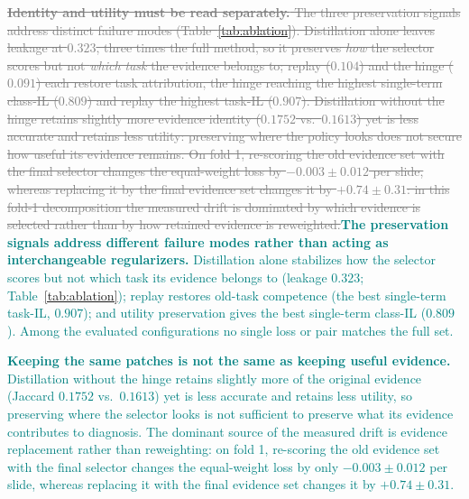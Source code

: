 \documentclass{article}
\newif\ifmarkup \markuptrue
\newcommand{\repc}[3]{\ifmarkup\textcolor{gray}{\sout{#2}}\textcolor{#1}{#3}\else#3\fi}
\newcommand{\repG}[2]{\repc{teal}{#1}{#2}}    %
\begin{document}
\repG{\textbf{Identity and utility must be read separately.} The three preservation signals address distinct failure modes (Table~\ref{tab:ablation}). Distillation alone leaves leakage at $0.323$, three times the full method, so it preserves \emph{how} the selector scores but not \emph{which task} the evidence belongs to; replay ($0.104$) and the hinge ($0.091$) each restore task attribution, the hinge reaching the highest single-term class-IL ($0.809$) and replay the highest task-IL ($0.907$). Distillation without the hinge retains slightly more evidence identity ($0.1752$ vs.\ $0.1613$) yet is less accurate and retains less utility: preserving where the policy looks does not secure how useful its evidence remains. On fold 1, re-scoring the old evidence set with the final selector changes the equal-weight loss by $-0.003{\pm}0.012$ per slide, whereas replacing it by the final evidence set changes it by $+0.74{\pm}0.31$: in this fold-1 decomposition the measured drift is dominated by which evidence is selected rather than by how retained evidence is reweighted.}{\textbf{The preservation signals address different failure modes rather than acting as interchangeable regularizers.} Distillation alone stabilizes how the selector scores but not which task its evidence belongs to (leakage $0.323$; Table~\ref{tab:ablation}); replay restores old-task competence (the best single-term task-IL, $0.907$); and utility preservation gives the best single-term class-IL ($0.809$). Among the evaluated configurations no single loss or pair matches the full set.}

\repG{}{\textbf{Keeping the same patches is not the same as keeping useful evidence.} Distillation without the hinge retains slightly more of the original evidence (Jaccard $0.1752$ vs.\ $0.1613$) yet is less accurate and retains less utility, so preserving where the selector looks is not sufficient to preserve what its evidence contributes to diagnosis. The dominant source of the measured drift is evidence replacement rather than reweighting: on fold 1, re-scoring the old evidence set with the final selector changes the equal-weight loss by only $-0.003{\pm}0.012$ per slide, whereas replacing it with the final evidence set changes it by $+0.74{\pm}0.31$.}
\end{document}
